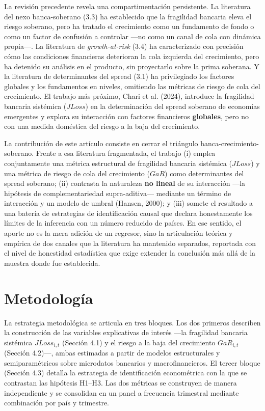\documentclass[5p,times,twocolumn,authoryear]{elsarticle}
\begin{document}
La revisión precedente revela una compartimentación persistente. La literatura del nexo banca-soberano (3.3) ha establecido que la fragilidad bancaria eleva el riesgo soberano, pero ha tratado el crecimiento como un fundamento de fondo o como un factor de confusión a controlar —no como un canal de cola con dinámica propia—. La literatura de \textit{growth-at-risk} (3.4) ha caracterizado con precisión cómo las condiciones financieras deterioran la cola izquierda del crecimiento, pero ha detenido su análisis en el producto, sin proyectarlo sobre la prima soberana. Y la literatura de determinantes del spread (3.1) ha privilegiado los factores globales y los fundamentos en niveles, omitiendo las métricas de riesgo de cola del crecimiento. El trabajo más próximo, Chari et al. (2024), introduce la fragilidad bancaria sistémica ($JLoss$) en la determinación del spread soberano de economías emergentes y explora su interacción con factores financieros \textbf{globales}, pero no con una medida doméstica del riesgo a la baja del crecimiento.

La contribución de este artículo consiste en cerrar el triángulo banca-crecimiento-soberano. Frente a esa literatura fragmentada, el trabajo (i) emplea conjuntamente una métrica estructural de fragilidad bancaria sistémica ($JLoss$) y una métrica de riesgo de cola del crecimiento ($GaR$) como determinantes del spread soberano; (ii) contrasta la naturaleza \textbf{no lineal} de su interacción —la hipótesis de complementariedad supra-aditiva— mediante un término de interacción y un modelo de umbral (Hansen, 2000); y (iii) somete el resultado a una batería de estrategias de identificación causal que declara honestamente los límites de la inferencia con un número reducido de países. En ese sentido, el aporte no es la mera adición de un regresor, sino la articulación teórica y empírica de dos canales que la literatura ha mantenido separados, reportada con el nivel de honestidad estadística que exige extender la conclusión más allá de la muestra donde fue establecida.


\section{Metodología}

La estrategia metodológica se articula en tres bloques. Los dos primeros describen la construcción de las variables explicativas de interés —la fragilidad bancaria sistémica $JLoss_{i,t}$ (Sección 4.1) y el riesgo a la baja del crecimiento $GaR_{i,t}$ (Sección 4.2)—, ambas estimadas a partir de modelos estructurales y semiparamétricos sobre microdatos bancarios y macrofinancieros. El tercer bloque (Sección 4.3) detalla la estrategia de identificación econométrica con la que se contrastan las hipótesis H1–H3. Las dos métricas se construyen de manera independiente y se consolidan en un panel a frecuencia trimestral mediante combinación por país y trimestre.
\end{document}
